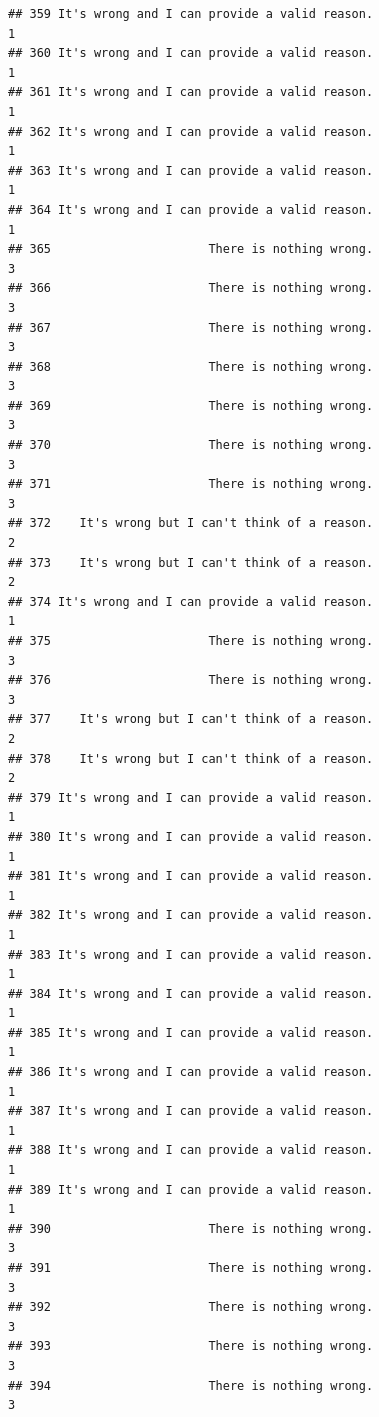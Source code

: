 \documentclass[
  american,
  man,floatsintext]{apa7}
\begin{document}
\begin{verbatim}
## 359 It's wrong and I can provide a valid reason.                    1
## 360 It's wrong and I can provide a valid reason.                    1
## 361 It's wrong and I can provide a valid reason.                    1
## 362 It's wrong and I can provide a valid reason.                    1
## 363 It's wrong and I can provide a valid reason.                    1
## 364 It's wrong and I can provide a valid reason.                    1
## 365                      There is nothing wrong.                    3
## 366                      There is nothing wrong.                    3
## 367                      There is nothing wrong.                    3
## 368                      There is nothing wrong.                    3
## 369                      There is nothing wrong.                    3
## 370                      There is nothing wrong.                    3
## 371                      There is nothing wrong.                    3
## 372    It's wrong but I can't think of a reason.                    2
## 373    It's wrong but I can't think of a reason.                    2
## 374 It's wrong and I can provide a valid reason.                    1
## 375                      There is nothing wrong.                    3
## 376                      There is nothing wrong.                    3
## 377    It's wrong but I can't think of a reason.                    2
## 378    It's wrong but I can't think of a reason.                    2
## 379 It's wrong and I can provide a valid reason.                    1
## 380 It's wrong and I can provide a valid reason.                    1
## 381 It's wrong and I can provide a valid reason.                    1
## 382 It's wrong and I can provide a valid reason.                    1
## 383 It's wrong and I can provide a valid reason.                    1
## 384 It's wrong and I can provide a valid reason.                    1
## 385 It's wrong and I can provide a valid reason.                    1
## 386 It's wrong and I can provide a valid reason.                    1
## 387 It's wrong and I can provide a valid reason.                    1
## 388 It's wrong and I can provide a valid reason.                    1
## 389 It's wrong and I can provide a valid reason.                    1
## 390                      There is nothing wrong.                    3
## 391                      There is nothing wrong.                    3
## 392                      There is nothing wrong.                    3
## 393                      There is nothing wrong.                    3
## 394                      There is nothing wrong.                    3

\end{verbatim}
\end{document}
